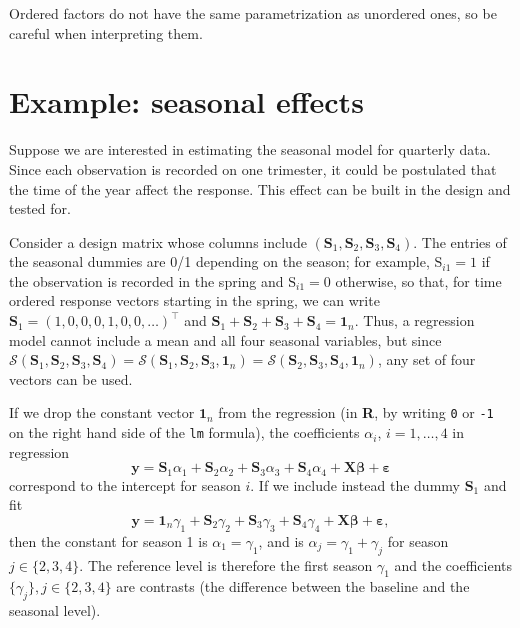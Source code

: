 \documentclass[]{book}
\theoremstyle{definition}
\theoremstyle{definition}
\theoremstyle{definition}
\theoremstyle{remark}
\begin{document}
Ordered factors do not have the same parametrization as unordered ones, so be careful when interpreting them.

\hypertarget{example-seasonal-effects}{%
\section{Example: seasonal effects}\label{example-seasonal-effects}}

Suppose we are interested in estimating the seasonal model for quarterly data. Since each observation is recorded on one trimester, it could be postulated that the time of the year affect the response. This effect can be built in the design and tested for.

Consider a design matrix whose columns include \((\mathbf{S}_1, \mathbf{S}_2, \mathbf{S}_3, \mathbf{S}_4)\). The entries of the seasonal dummies are 0/1 depending on the season; for example, \(\mathrm{S}_{i1}=1\) if the observation is recorded in the spring and \(\mathrm{S}_{i1}=0\) otherwise, so that, for time ordered response vectors starting in the spring, we can write \(\mathbf{S}_1=(1,0,0,0,1,0,0,\ldots)^\top\) and \(\mathbf{S}_1 + \mathbf{S}_2 + \mathbf{S}_3 + \mathbf{S}_4 = \mathbf{1}_n\). Thus, a regression model cannot include a mean and all four seasonal variables, but since \(\mathscr{S}(\mathbf{S}_1, \mathbf{S}_2, \mathbf{S}_3, \mathbf{S}_4) = \mathscr{S}(\mathbf{S}_1, \mathbf{S}_2, \mathbf{S}_3, \mathbf{1}_n) = \mathscr{S}(\mathbf{S}_2, \mathbf{S}_3, \mathbf{S}_4, \mathbf{1}_n)\), any set of four vectors can be used.

If we drop the constant vector \(\mathbf{1}_n\) from the regression (in \textbf{R}, by writing \texttt{0} or \texttt{-1} on the right hand side of the \texttt{lm} formula), the coefficients \(\alpha_i\), \(i=1, \ldots, 4\) in regression
\[\boldsymbol{y} = \mathbf{S}_1\alpha_1 +\mathbf{S}_2\alpha_2  + \mathbf{S}_3\alpha_3 + \mathbf{S}_4\alpha_4 + \mathbf{X}\boldsymbol{\beta} + \boldsymbol{\varepsilon}\]
correspond to the intercept for season \(i\). If we include instead the dummy \(\mathbf{S}_1\) and fit
\[\boldsymbol{y} = \mathbf{1}_n\gamma_1 +\mathbf{S}_2\gamma_2  + \mathbf{S}_3\gamma_3 + \mathbf{S}_4\gamma_4 + \mathbf{X}\boldsymbol{\beta} + \boldsymbol{\varepsilon},\]
then the constant for season 1 is \(\alpha_1=\gamma_1\), and is \(\alpha_j=\gamma_1+\gamma_j\) for season \(j \in \{2, 3, 4\}\). The reference level is therefore the first season \(\gamma_1\) and the coefficients \(\{\gamma_j\}, j \in \{2, 3, 4\}\) are contrasts (the difference between the baseline and the seasonal level).
\end{document}
